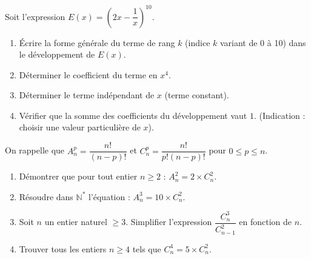 \documentclass[11pt]{article}
\begin{document}
\begin{exercice}
Soit l'expression $E(x) = \left(2x - \dfrac{1}{x}\right)^{10}$.
\begin{enumerate}
    \item Écrire la forme générale du terme de rang $k$ (indice $k$ variant de 0 à 10) dans le développement de $E(x)$.
    \item Déterminer le coefficient du terme en $x^{4}$.
    \item Déterminer le terme indépendant de $x$ (terme constant).
    \item Vérifier que la somme des coefficients du développement vaut $1$. (Indication : choisir une valeur particulière de $x$).
\end{enumerate}
\end{exercice}

\begin{exercice}
On rappelle que $A_n^p = \dfrac{n!}{(n-p)!}$ et $C_n^p = \dfrac{n!}{p!(n-p)!}$ pour $0 \le p \le n$.
\begin{enumerate}
    \item Démontrer que pour tout entier $n \ge 2$ : $A_n^2 = 2 \times C_n^2$.
    \item Résoudre dans $\mathbb{N}^*$ l'équation : $A_n^3 = 10 \times C_n^2$.
    \item Soit $n$ un entier naturel $\ge 3$. Simplifier l'expression $\dfrac{C_n^3}{C_{n-1}^2}$ en fonction de $n$.
    \item Trouver tous les entiers $n \ge 4$ tels que $C_n^4 = 5 \times C_n^2$.
\end{enumerate}
\end{exercice}
\end{document}
